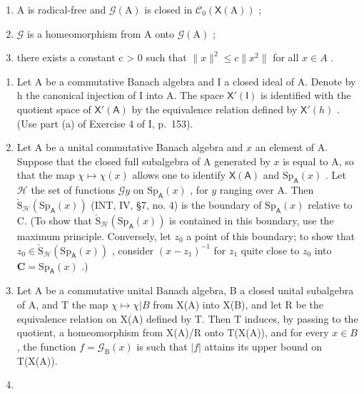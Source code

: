 \begin{enumerate}
\def\labelenumi{(\roman{enumi})}
\item
  A is radical-free and \(\mathcal{G}(\mathrm{A})\) is closed in \(\mathcal{C}_0(\mathsf{X}(\mathrm{A}))\) ;
\item
  \(\mathcal{G}\) is a homeomorphism from A onto \(\mathcal{G}(\mathrm{A})\) ;
\item
  there exists a constant c \textgreater{} 0 such that \(\|x\|^{2} \leqslant c\|x^{2}\|\) for all \(x \in A\) .
\end{enumerate}

\begin{enumerate}
\def\labelenumi{\arabic{enumi})}
\setcounter{enumi}{16}
\item
  Let A be a commutative Banach algebra and I a closed ideal of A. Denote by h the canonical injection of I into A. The space \(\mathsf{X}'(\mathsf{I})\) is identified with the quotient space of \(\mathsf{X}'(\mathsf{A})\) by the equivalence relation defined by \(\mathsf{X}'(h)\) . (Use part (a) of Exercise 4 of I, p.~153).
\item
  Let A be a unital commutative Banach algebra and \(x\) an element of A. Suppose that the closed full subalgebra of A generated by \(x\) is equal to A, so that the map \(\chi \mapsto \chi(x)\) allows one to identify \(\mathsf{X}(\mathsf{A})\) and \(\mathrm{Sp}_{\mathsf{A}}(x)\) . Let \(\mathcal{H}\) the set of functions \(\mathcal{G}y\) on \(\mathrm{Sp}_{\mathsf{A}}(x)\) , for \(y\) ranging over A. Then \(\check{\mathrm{S}}_{\mathcal{H}}(\mathrm{Sp}_{\mathsf{A}}(x))\) (INT, IV, §7, no. 4) is the boundary of \(\mathrm{Sp}_{\mathsf{A}}(x)\) relative to C. (To show that \(\check{\mathrm{S}}_{\mathcal{H}}(\mathrm{Sp}_{\mathsf{A}}(x))\) is contained in this boundary, use the maximum principle. Conversely, let \(z_0\) a point of this boundary; to show that \(z_0 \in \check{\mathrm{S}}_{\mathcal{H}}(\mathrm{Sp}_{\mathsf{A}}(x))\) , consider \((x - z_1)^{-1}\) for \(z_1\) quite close to \(z_0\) into \(\mathbf{C} = \mathrm{Sp}_{\mathsf{A}}(x)\) .)
\item
  Let A be a commutative unital Banach algebra, B a closed unital subalgebra of A, and T the map \(\chi \mapsto \chi|B\) from X(A) into X(B), and let R be the equivalence relation on X(A) defined by T. Then T induces, by passing to the quotient, a homeomorphism from X(A)/R onto T(X(A)), and for every \(x \in B\) , the function \(f = \mathcal{G}_{\mathrm{B}}(x)\) is such that \(|f|\) attains its upper bound on T(X(A)).
\item

\end{enumerate}
